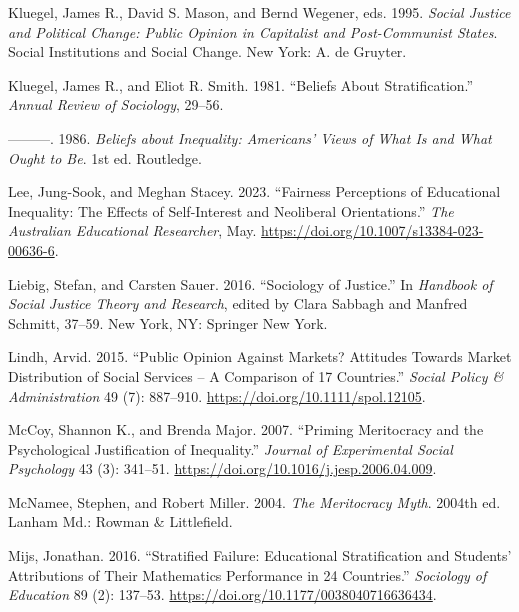 \documentclass[
]{article}
\newlength{\cslhangindent}
\newenvironment{CSLReferences}[2] %
 {\begin{list}{}{%
  \setlength{\itemindent}{0pt}
  \setlength{\leftmargin}{0pt}
  \setlength{\parsep}{0pt}
  \ifodd #1
   \setlength{\leftmargin}{\cslhangindent}
   \setlength{\itemindent}{-1\cslhangindent}
  \fi
  \setlength{\itemsep}{#2\baselineskip}}}
 {\end{list}}
\begin{document}
\begin{CSLReferences}{1}{0}
Kluegel, James R., David S. Mason, and Bernd Wegener, eds. 1995.
\emph{Social Justice and Political Change: Public Opinion in Capitalist
and Post-Communist States}. Social Institutions and Social Change. New
York: A. de Gruyter.

Kluegel, James R., and Eliot R. Smith. 1981. {``Beliefs {About
Stratification}.''} \emph{Annual Review of Sociology}, 29--56.

---------. 1986. \emph{Beliefs about {Inequality}: {Americans}' {Views}
of {What Is} and {What Ought} to {Be}}. 1st ed. Routledge.

Lee, Jung-Sook, and Meghan Stacey. 2023. {``Fairness Perceptions of
Educational Inequality: The Effects of Self-Interest and Neoliberal
Orientations.''} \emph{The Australian Educational Researcher}, May.
\url{https://doi.org/10.1007/s13384-023-00636-6}.

Liebig, Stefan, and Carsten Sauer. 2016. {``Sociology of {Justice}.''}
In \emph{Handbook of {Social Justice Theory} and {Research}}, edited by
Clara Sabbagh and Manfred Schmitt, 37--59. New York, NY: Springer New
York.

Lindh, Arvid. 2015. {``Public {Opinion} Against {Markets}? {Attitudes}
Towards {Market Distribution} of {Social Services} -- {A Comparison} of
17 {Countries}.''} \emph{Social Policy \& Administration} 49 (7):
887--910. \url{https://doi.org/10.1111/spol.12105}.

McCoy, Shannon K., and Brenda Major. 2007. {``Priming Meritocracy and
the Psychological Justification of Inequality.''} \emph{Journal of
Experimental Social Psychology} 43 (3): 341--51.
\url{https://doi.org/10.1016/j.jesp.2006.04.009}.

McNamee, Stephen, and Robert Miller. 2004. \emph{The Meritocracy Myth}.
2004th ed. Lanham Md.: Rowman \& Littlefield.

Mijs, Jonathan. 2016. {``Stratified {Failure}: {Educational
Stratification} and {Students}' {Attributions} of {Their Mathematics
Performance} in 24 {Countries}.''} \emph{Sociology of Education} 89 (2):
137--53. \url{https://doi.org/10.1177/0038040716636434}.


\end{CSLReferences}
\end{document}
